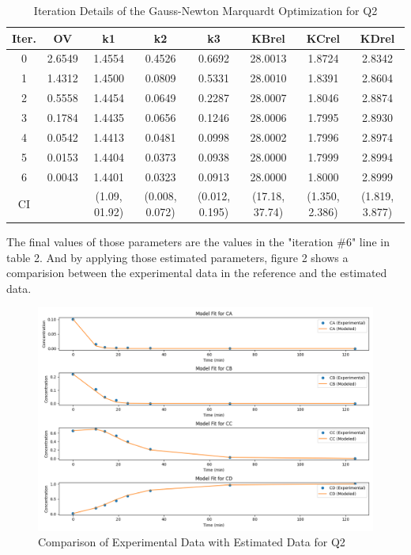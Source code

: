 \documentclass[a4paper,12pt]{article} %
\begin{document}
\begin{table}
    \centering
    \begin{tabular}{|c|c|c|c|c|c|c|c|}
    \hline
    Iter. & OV & k1 & k2 & k3 & KBrel & KCrel & KDrel\\ \hline
    0 & 2.6549 & 1.4554& 0.4526& 0.6692& 28.0013& 1.8724& 2.8342 \\ \hline
    1 & 1.4312 & 1.4500& 0.0809& 0.5331& 28.0010& 1.8391& 2.8604 \\ \hline
    2 & 0.5558 & 1.4454& 0.0649& 0.2287& 28.0007& 1.8046& 2.8874 \\ \hline
    3 & 0.1784 & 1.4435& 0.0656& 0.1246& 28.0006& 1.7995& 2.8930 \\ \hline
    4 & 0.0542 & 1.4413& 0.0481& 0.0998& 28.0002& 1.7996& 2.8974 \\ \hline
    5 & 0.0153 & 1.4404& 0.0373& 0.0938& 28.0000& 1.7999& 2.8994 \\ \hline 
    6 & 0.0043 & 1.4401& 0.0323& 0.0913& 28.0000& 1.8000& 2.8999 \\ \hline 
    CI& &(1.09, 01.92)& (0.008, 0.072)&(0.012, 0.195)&(17.18, 37.74)& (1.350, 2.386)&(1.819, 3.877)\\ \hline 
    \end{tabular}
    \caption{Iteration Details of the Gauss-Newton Marquardt Optimization for Q2}
    \label{tab:iteration_details}
    \end{table}
The final values of those parameters are the values in the "iteration \#6" line in table 2. And by 
applying those estimated parameters, figure 2 shows
a comparision between the experimental data in the reference and the estimated data.
\clearpage

\begin{figure}[ht]
    \centering
    \includegraphics[width=1\textwidth]{Q2_GNM_comp.png}
    \caption{Comparison of Experimental Data with Estimated Data for Q2}
\end{figure}
\clearpage
\end{document}
